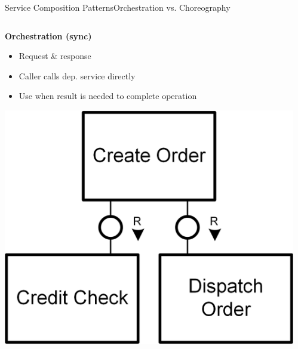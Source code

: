 \begin{frame}[fragile]{Service Composition Patterns}{Orchestration vs. Choreography}
\begin{columns}[T] 
\begin{column}{.48\textwidth}
\textbf{Orchestration (sync)}\\
\small
\vspace{-2mm}
\begin{itemize}
	\item Request \& response
	\item Caller calls dep. service directly
	\item Use when result is needed to complete operation
\end{itemize}
\vspace{3mm}
\includegraphics[height=0.25\textheight]{../Service2ServiceCommunication/images/Orchestration}
\end{column}
\hfill
\begin{column}{.48\textwidth}
\end{column}
\end{columns}
\end{frame}
